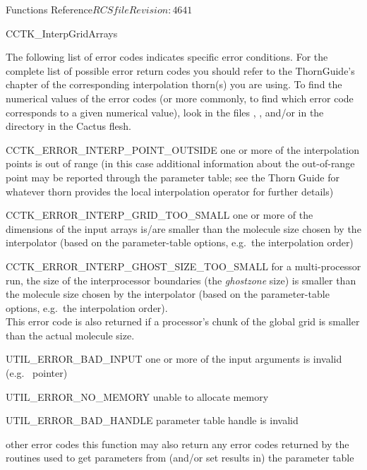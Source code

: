 \begin{cactuspart}{ Functions Reference}{$RCSfile$}{$Revision: 4641 $}
\begin{FunctionDescription}{CCTK\_InterpGridArrays}
\begin{ErrorSection}
\begin{Error}{}
The following list of error
codes indicates specific error conditions. For the complete list of possible
error return codes you should refer to the ThornGuide's chapter of the
corresponding interpolation thorn(s) you are using.  To find the numerical
values of the error codes (or more commonly, to find which error code
corresponds to a given numerical value), look in the files
, , and/or 
in the  directory in the Cactus flesh.
\end{Error}
\begin{Error}{CCTK\_ERROR\_INTERP\_POINT\_OUTSIDE}
one or more of the interpolation points is out of range
(in this case additional information about the out-of-range point
may be reported through the parameter table; see the Thorn Guide for
whatever thorn provides the local interpolation operator for further
details)
\end{Error}
\begin{Error}{CCTK\_ERROR\_INTERP\_GRID\_TOO\_SMALL}
one or more of the dimensions of the input arrays is/are smaller than
the molecule size chosen by the interpolator (based on the parameter-table
options, e.g.\ the interpolation order)
\end{Error}
\begin{Error}{CCTK\_ERROR\_INTERP\_GHOST\_SIZE\_TOO\_SMALL}
for a multi-processor run, the size of the interprocessor boundaries (the {\em ghostzone} size) is smaller than the molecule size chosen by the interpolator
(based on the parameter-table options, e.g.\ the interpolation order).\\
This error code is also returned if a processor's chunk of the global grid
is smaller than the actual molecule size.
\end{Error}
\begin{Error}{UTIL\_ERROR\_BAD\_INPUT}
one or more of the input arguments is invalid (e.g.~ pointer)
\end{Error}
\begin{Error}{UTIL\_ERROR\_NO\_MEMORY}
unable to allocate memory
\end{Error}
\begin{Error}{UTIL\_ERROR\_BAD\_HANDLE}
parameter table handle is invalid
\end{Error}
\begin{Error}{other error codes}
this function may also return any error codes returned by the
 routines used to get parameters from
(and/or set results in) the parameter table
\end{Error}
\end{ErrorSection}


\end{FunctionDescription}
\end{cactuspart}
